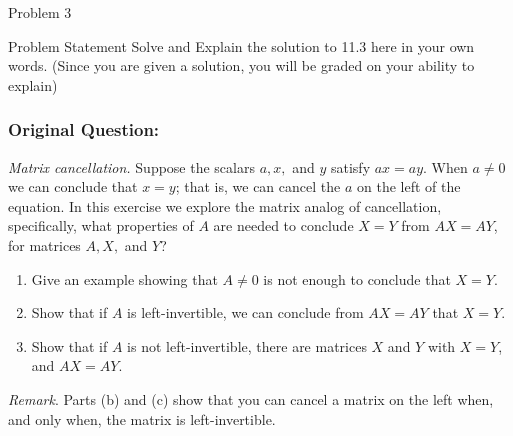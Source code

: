\begin{problem}{Problem 3}
    \begin{statement}{Problem Statement}
        Solve and Explain the solution to 11.3 here in your own words. (Since you are given a solution, you will be graded on your ability to explain)

        \subsubsection*{Original Question:}

        \textit{Matrix cancellation.} Suppose the scalars $a, x,$ and $y$ satisfy $ax = ay$. When $a \neq 0$ we can conclude that $x = y$; that is, we can cancel the $a$ on the left of the equation. 
        In this exercise we explore the matrix analog of cancellation, specifically, what properties of $A$ are needed to conclude $X = Y$ from $AX = AY$, for matrices $A, X,$ and $Y$?

        \begin{enumerate}[label = (\alph*)]
            \item Give an example showing that $A \neq 0$ is not enough to conclude that $X = Y$.
            \item Show that if $A$ is left-invertible, we can conclude from $AX = AY$ that $X = Y$.
            \item Show that if $A$ is not left-invertible, there are matrices $X$ and $Y$ with $X = Y$, and $AX = AY$.
        \end{enumerate}
        \textit{Remark}. Parts (b) and (c) show that you can cancel a matrix on the left when, and only when, the matrix is left-invertible.
    \end{statement}
\end{problem}

